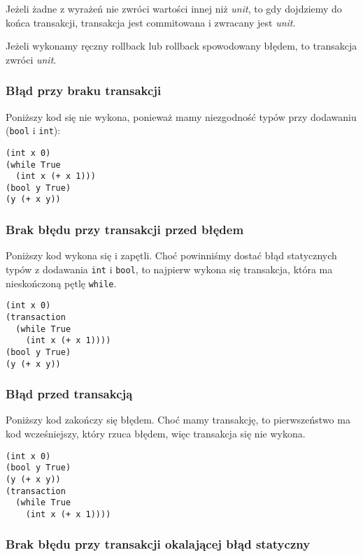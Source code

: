 \documentclass{article}
\begin{document}
Jeżeli żadne z wyrażeń nie zwróci wartości innej niż \textit{unit}, to gdy dojdziemy do końca transakcji, transakcja jest commitowana i zwracany jest \textit{unit}.

Jeżeli wykonamy ręczny rollback lub rollback spowodowany błędem, to transakcja zwróci \textit{unit}.

\subsubsection{Błąd przy braku transakcji}

Poniższy kod się nie wykona, ponieważ mamy niezgodność typów przy dodawaniu (\texttt{bool} i \texttt{int}):

\begin{lstlisting}
(int x 0)
(while True
  (int x (+ x 1)))
(bool y True)
(y (+ x y))
\end{lstlisting}

\subsubsection{Brak błędu przy transakcji przed błędem}

Poniższy kod wykona się i zapętli. Choć powinniśmy dostać błąd statycznych typów z dodawania \texttt{int} i \texttt{bool}, to najpierw wykona się transakcja, która ma nieskończoną pętlę \texttt{while}.

\begin{lstlisting}
(int x 0)
(transaction
  (while True
    (int x (+ x 1))))
(bool y True)
(y (+ x y))
\end{lstlisting}

\subsubsection{Błąd przed transakcją}

Poniższy kod zakończy się błędem. Choć mamy transakcję, to pierwszeństwo ma kod wcześniejszy, który rzuca błędem, więc transakcja się nie wykona.

\begin{lstlisting}
(int x 0)
(bool y True)
(y (+ x y))
(transaction
  (while True
    (int x (+ x 1))))
\end{lstlisting}

\subsubsection{Brak błędu przy transakcji okalającej błąd statyczny}
\end{document}
